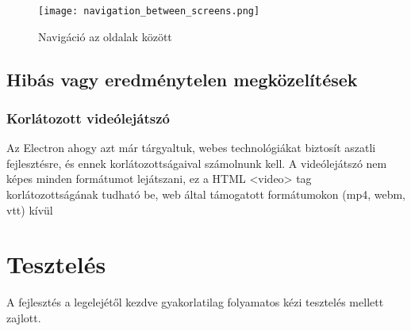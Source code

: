\begin{figure}[H]
	\centering
	\texttt{[image: navigation\_between\_screens.png]}
	\caption{Navigáció az oldalak között}
	\label{fig:navigation_between_screens}
\end{figure}

\subsection{Hibás vagy eredménytelen megközelítések}

\subsubsection{Korlátozott videólejátszó}
Az Electron ahogy azt már tárgyaltuk, webes technológiákat biztosít aszatli fejlesztésre, és ennek korlátozottságaival számolnunk kell. A videólejátszó nem képes minden formátumot lejátszani, ez a HTML <video> tag korlátozottságának tudható be, web által támogatott formátumokon (mp4, webm, vtt) kívül

\section{Tesztelés}
A fejlesztés a legelejétől kezdve gyakorlatilag folyamatos kézi tesztelés mellett zajlott.


